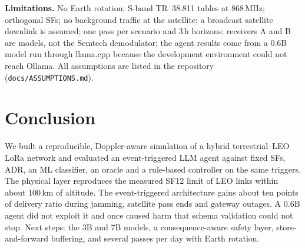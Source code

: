 \textbf{Limitations.} No Earth rotation; S-band TR~38.811 tables at 868\,MHz; orthogonal SFs; no
background traffic at the satellite; a broadcast satellite downlink is assumed; one pass per
scenario and 3\,h horizons; receivers A and B are models, not the Semtech demodulator; the agent
results come from a 0.6B model run through llama.cpp because the development environment could not
reach Ollama. All assumptions are listed in the repository (\texttt{docs/ASSUMPTIONS.md}).

\section{Conclusion}
We built a reproducible, Doppler-aware simulation of a hybrid terrestrial--LEO LoRa network and
evaluated an event-triggered LLM agent against fixed SFs, ADR, an ML classifier, an oracle and a
rule-based controller on the same triggers. The physical layer reproduces the measured SF12 limit
of LEO links within about 100\,km of altitude. The event-triggered architecture gains about ten
points of delivery ratio during jamming, satellite pass ends and gateway outages. A 0.6B agent did
not exploit it and once caused harm that schema validation could not stop. Next steps: the 3B and
7B models, a consequence-aware safety layer, store-and-forward buffering, and several passes per
day with Earth rotation.
